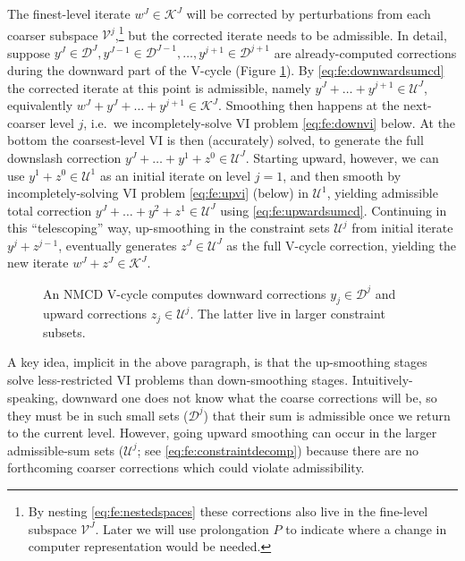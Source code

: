 \documentclass[letterpaper,final,12pt,reqno]{amsart}
\theoremstyle{cstyle}
\theoremstyle{cstyle*}
\theoremstyle{dstyle}
\numberwithin{equation}{section}
\numberwithin{figure}{section}
\numberwithin{table}{section}
\numberwithin{theorem}{section}
\begin{document}
The finest-level iterate $w^J \in \mathcal{K}^J$ will be corrected by perturbations from each coarser subspace $\mathcal{V}^j$,\footnote{By nesting \eqref{eq:fe:nestedspaces} these corrections also live in the fine-level subspace $\mathcal{V}^J$.  Later we will use prolongation $P$ to indicate where a change in computer representation would be needed.} but the corrected iterate needs to be admissible.  In detail, suppose $y^J \in \mathcal{D}^J, y^{J-1} \in \mathcal{D}^{J-1}, \dots, y^{j+1} \in \mathcal{D}^{j+1}$ are already-computed corrections during the downward part of the V-cycle (Figure \ref{fig:nmcdvcycle}).  By \eqref{eq:fe:downwardsumcd} the corrected iterate at this point is admissible, namely $y^J + \dots + y^{j+1} \in \mathcal{U}^J$, equivalently $w^J + y^J + \dots + y^{j+1} \in \mathcal{K}^J$.  Smoothing then happens at the next-coarser level $j$, i.e.~we incompletely-solve VI problem \eqref{eq:fe:downvi} below.  At the bottom the coarsest-level VI is then (accurately) solved, to generate the full downslash correction $y^J + \dots + y^1 + z^0 \in \mathcal{U}^J$.  Starting upward, however, we can use $y^1+ z^0 \in \mathcal{U}^1$ as an initial iterate on level $j=1$, and then smooth by incompletely-solving VI problem \eqref{eq:fe:upvi} (below) in $\mathcal{U}^1$, yielding admissible total correction $y^J + \dots + y^2 + z^1 \in \mathcal{U}^J$ using \eqref{eq:fe:upwardsumcd}.  Continuing in this ``telescoping'' way, up-smoothing in the constraint sets $\mathcal{U}^j$ from initial iterate $y^j+z^{j-1}$, eventually generates $z^J\in \mathcal{U}^J$ as the full V-cycle correction, yielding the new iterate $w^J + z^J \in \mathcal{K}^J$.

\begin{figure}[ht]
\begin{center}

\end{center}
\caption{An NMCD V-cycle computes downward corrections $y_j \in \mathcal{D}^j$ and upward corrections $z_j\in\mathcal{U}^j$.  The latter live in larger constraint subsets.}
\label{fig:nmcdvcycle}
\end{figure}

A key idea, implicit in the above paragraph, is that the up-smoothing stages solve less-restricted VI problems than down-smoothing stages.  Intuitively-speaking, downward one does not know what the coarse corrections will be, so they must be in such small sets ($\mathcal{D}^j$) that their sum is admissible once we return to the current level.  However, going upward smoothing can occur in the larger admissible-sum sets ($\mathcal{U}^j$; see \eqref{eq:fe:constraintdecomp}) because there are no forthcoming coarser corrections which could violate admissibility.
\end{document}
